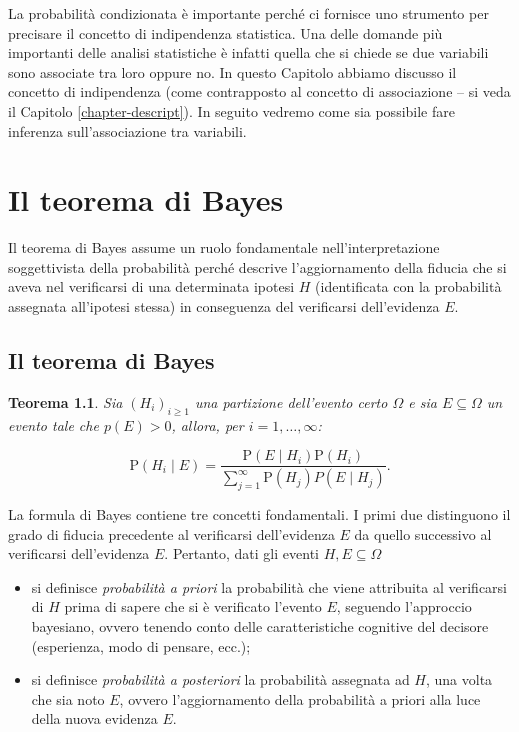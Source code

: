 \documentclass[
  11pt,
]{krantz}
\providecommand{\tightlist}{%
  \setlength{\itemsep}{0pt}\setlength{\parskip}{0pt}}
\newtheorem{theorem}{Teorema}[chapter]
\theoremstyle{definition}
\theoremstyle{definition}
\theoremstyle{definition}
\theoremstyle{definition}
\theoremstyle{remark}
\begin{document}
La probabilità condizionata è importante perché ci fornisce uno strumento per precisare il concetto di indipendenza statistica. Una delle domande più importanti delle analisi statistiche è infatti quella che si chiede se due variabili sono associate tra loro oppure no. In questo Capitolo abbiamo discusso il concetto di indipendenza (come contrapposto al concetto di associazione -- si veda il Capitolo \ref{chapter-descript}). In seguito vedremo come sia possibile fare inferenza sull'associazione tra variabili.

\hypertarget{chapter-teo-bayes}{%
\chapter{Il teorema di Bayes}\label{chapter-teo-bayes}}

Il teorema di Bayes assume un ruolo fondamentale nell'interpretazione soggettivista della probabilità perché descrive l'aggiornamento della fiducia che si aveva nel verificarsi di una determinata ipotesi \(H\) (identificata con la probabilità assegnata all'ipotesi stessa) in conseguenza del verificarsi dell'evidenza \(E\).

\hypertarget{il-teorema-di-bayes}{%
\section{Il teorema di Bayes}\label{il-teorema-di-bayes}}

\begin{theorem}
Sia \((H_i)_{i\geq 1}\) una partizione dell'evento certo \(\Omega\) e sia \(E \subseteq \Omega\) un evento tale che \(p(E) > 0\), allora, per \(i = 1, \dots, \infty\):

\begin{equation}
{\mbox{P}}(H_i \mid E) = \frac{{\mbox{P}}(E \mid H_i){\mbox{P}}(H_i)}{\sum_{j=1}^{\infty}{\mbox{P}}(H_j)P(E \mid H_j)}.
\label{eq:bayes2}
\end{equation}
\end{theorem}

La formula di Bayes contiene tre concetti fondamentali. I primi due distinguono il grado di fiducia precedente al verificarsi dell'evidenza \(E\) da quello successivo al verificarsi dell'evidenza \(E\). Pertanto, dati gli eventi \(H, E \subseteq \Omega\)

\begin{itemize}
\tightlist
\item
  si definisce \emph{probabilità a priori} la probabilità che viene attribuita al verificarsi di \(H\) prima di sapere che si è verificato l'evento \(E\), seguendo l'approccio bayesiano, ovvero tenendo conto delle caratteristiche cognitive del decisore (esperienza, modo di pensare, ecc.);
\item
  si definisce \emph{probabilità a posteriori} la probabilità assegnata ad \(H\), una volta che sia noto \(E\), ovvero l'aggiornamento della probabilità a priori alla luce della nuova evidenza \(E\).
\end{itemize}
\end{document}
